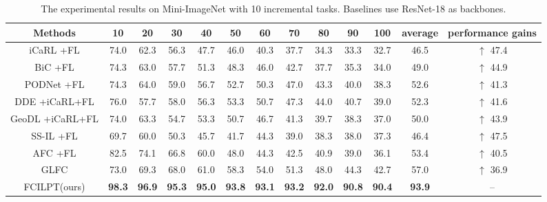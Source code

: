 \documentclass[sigconf,anonymous,review,screen]{acmart}
\begin{document}
\begin{table*}[t]\footnotesize
	\centering
	\caption{The experimental results on Mini-ImageNet with 10 incremental tasks. Baselines use ResNet-18 as backbones.}
	\label{tab:2}{
		\begin{tabular}{ccccccccccccc}
			\toprule
			Methods & 10 & 20 & 30 & 40 & 50 & 60 & 70 & 80 & 90 & 100 & average & performance gains \\
			\midrule
			iCaRL \cite{rebuffi2017icarl}+FL & 74.0 & 62.3 & 56.3 & 47.7 & 46.0 & 40.3 & 37.7 & 34.3 & 33.3 & 32.7 & 46.5 & $\uparrow$ 47.4  \\
			BiC \cite{wu2019large}+FL & 74.3 & 63.0 & 57.7 & 51.3 & 48.3 & 46.0 & 42.7 & 37.7 & 35.3 & 34.0 & 49.0 & $\uparrow$ 44.9 \\
			PODNet \cite{douillard2020podnet}+FL & 74.3 & 64.0 & 59.0 & 56.7 & 52.7 & 50.3 & 47.0 & 43.3 & 40.0 & 38.3 & 52.6 & $\uparrow$ 41.3 \\
			DDE \cite{hu2021distilling}+iCaRL+FL & 76.0 & 57.7 & 58.0 & 56.3 & 53.3 & 50.7 & 47.3 & 44.0 & 40.7 & 39.0 & 52.3 & $\uparrow$ 41.6 \\
			GeoDL \cite{simon2021learning}+iCaRL+FL & 74.0 & 63.3 & 54.7 & 53.3 & 50.7 & 46.7 & 41.3 & 39.7 & 38.3 & 37.0 & 50.0 & $\uparrow$ 43.9 \\
			SS-IL \cite{ahn2021ss}+FL & 69.7 & 60.0 & 50.3 & 45.7 & 41.7 & 44.3 & 39.0 & 38.3 & 38.0 & 37.3 & 46.4 & $\uparrow$ 47.5 \\
			AFC \cite{kang2022class}+FL & 82.5 & 74.1 & 66.8 & 60.0 & 48.0 & 44.3 & 42.5 & 40.9 & 39.0 & 36.1 & 53.4 & $\uparrow$ 40.5 \\
			GLFC \cite{dong2022federated}& 73.0 & 69.3 & 68.0 & 61.0 & 58.3 & 54.0 & 51.3 & 48.0 & 44.3 & 42.7 & 57.0 & $\uparrow$ 36.9 \\
			FCILPT(ours) & \textbf{98.3} & \textbf{96.9} & \textbf{95.3} & \textbf{95.0} & \textbf{93.8} & \textbf{93.1} & \textbf{93.2} & \textbf{92.0} & \textbf{90.8} & \textbf{90.4} & \textbf{93.9} & -- \\
			\bottomrule
	\end{tabular}	}
\end{table*}
\end{document}
